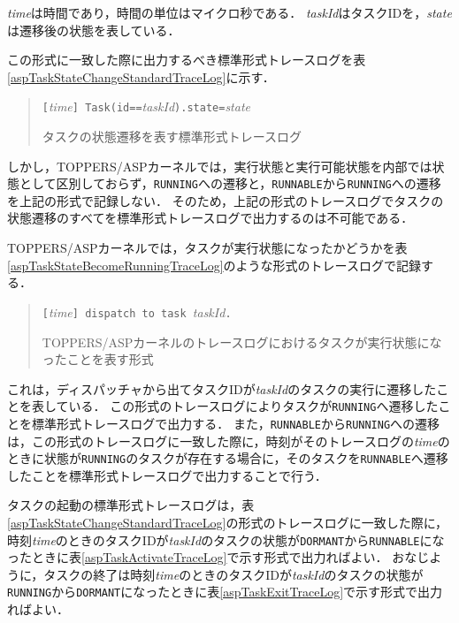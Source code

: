 {\it time}は時間であり，時間の単位はマイクロ秒である．
{\it taskId}はタスクIDを，{\it state}は遷移後の状態を表している．

この形式に一致した際に出力するべき標準形式トレースログを表\ref{aspTaskStateChangeStandardTraceLog}に示す．

\begin{table}[p]
\begin{quote}
\begin{breakbox}
{\tt [}{\it time}{\tt ] Task(id==}{\it taskId}{\tt ).state=}{\it state}
\end{breakbox}
\caption{タスクの状態遷移を表す標準形式トレースログ}
\label{aspTaskStateChangeStandardTraceLog}
\end{quote}
\end{table}

しかし，TOPPERS/ASPカーネルでは，実行状態と実行可能状態を内部では状態として区別しておらず，{\tt RUNNING}への遷移と，{\tt RUNNABLE}から{\tt RUNNING}への遷移を上記の形式で記録しない．
そのため，上記の形式のトレースログでタスクの状態遷移のすべてを標準形式トレースログで出力するのは不可能である．

TOPPERS/ASPカーネルでは，タスクが実行状態になったかどうかを表\ref{aspTaskStateBecomeRunningTraceLog}のような形式のトレースログで記録する．

\begin{table}[p]
\begin{quote}
\begin{breakbox}
{\tt [}{\it time}{\tt ] dispatch to task }{\it taskId}{\tt .}
\end{breakbox}
\caption{TOPPERS/ASPカーネルのトレースログにおけるタスクが実行状態になったことを表す形式}
\label{aspTaskStateBecomeRunningTraceLog}
\end{quote}
\end{table}

これは，ディスパッチャから出てタスクIDが{\it taskId}のタスクの実行に遷移したことを表している．
この形式のトレースログによりタスクが{\tt RUNNING}へ遷移したことを標準形式トレースログで出力する．
また，{\tt RUNNABLE}から{\tt RUNNING}への遷移は，この形式のトレースログに一致した際に，時刻がそのトレースログの{\it time}のときに状態が{\tt RUNNING}のタスクが存在する場合に，そのタスクを{\tt RUNNABLE}へ遷移したことを標準形式トレースログで出力することで行う．

タスクの起動の標準形式トレースログは，表\ref{aspTaskStateChangeStandardTraceLog}の形式のトレースログに一致した際に，時刻{\it time}のときのタスクIDが{\it taskId}のタスクの状態が{\tt DORMANT}から{\tt RUNNABLE}になったときに表\ref{aspTaskActivateTraceLog}で示す形式で出力ればよい．
おなじように，タスクの終了は時刻{\it time}のときのタスクIDが{\it taskId}のタスクの状態が{\tt RUNNING}から{\tt DORMANT}になったときに表\ref{aspTaskExitTraceLog}で示す形式で出力ればよい．

